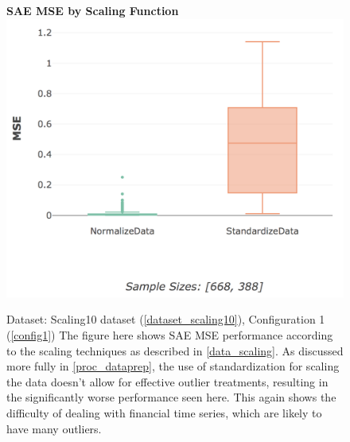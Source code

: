 \documentclass[a4paper,11pt,oneside]{article}
\theoremstyle{plain}
\theoremstyle{definition}
\begin{document}
	\begin{figure}[H]
		\centering 
		\textbf{SAE MSE by Scaling Function}
		\includegraphics[scale=0.4]{images/results/complexity/mse_scaling.png}
		\caption[SAE MSE by Scaling Function]
		{Dataset: Scaling10 dataset (\ref{dataset_scaling10}), Configuration 1 (\ref{config1})
			\newline The figure here shows SAE MSE performance according to the scaling techniques as described in \ref{data_scaling}. As discussed more fully in \ref{proc_dataprep}, the use of standardization for scaling the data doesn't allow for effective outlier treatments, resulting in the significantly worse performance seen here. This again shows the difficulty of dealing with financial time series, which are likely to have many outliers.}
		\label{figure-actual_mse_scaling}
	\end{figure}
\end{document}
